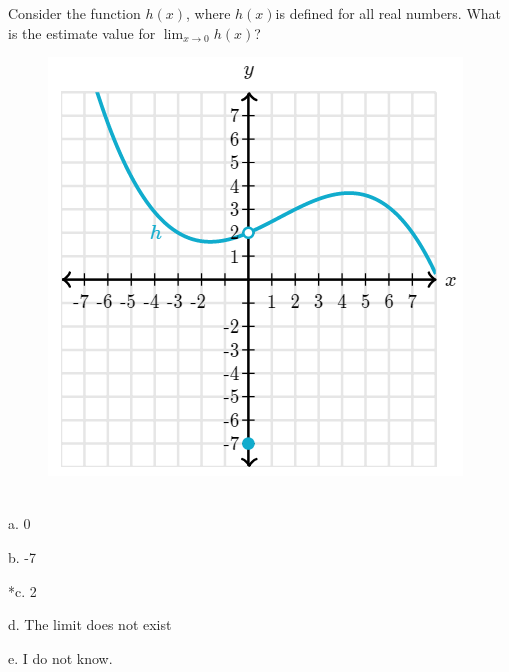 
Consider the function \(h(x)\), where \(h(x)\)is defined for all real numbers. What is the estimate value for
$\displaystyle \lim_{x \rightarrow 0}h(x)$?
\begin{figure}[h!]
    \centering
    \includegraphics{../../Images/Limits2.png}
\end{figure}\\

a. 0

b. -7

*c. 2

d. The limit does not exist

e. I do not know.\\
